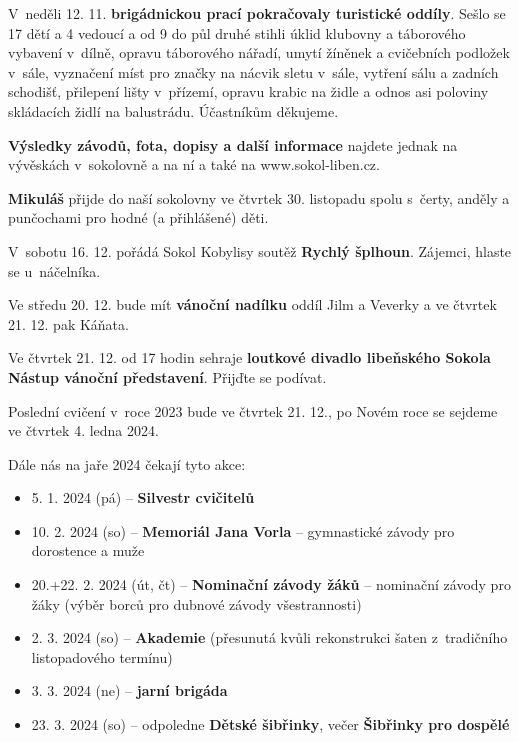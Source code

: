 \documentclass[11pt]{article}
\begin{document}
V~neděli 12. 11. \textbf{brigádnickou prací pokračovaly turistické oddíly}. Sešlo se 17 dětí a 4 vedoucí a od 9 do půl druhé stihli úklid klubovny a táborového vybavení v~dílně, opravu táborového nářadí, umytí žíněnek a cvičebních podložek v~sále, vyznačení míst pro značky na nácvik sletu v~sále, vytření sálu a zadních schodišť, přilepení lišty v~přízemí, opravu krabic na židle a odnos asi poloviny skládacích židlí na balustrádu.
Účastníkům děkujeme. 

\textbf{Výsledky závodů, fota, dopisy a další informace} najdete jednak na vývěskách v~sokolovně a na ní a také na www.sokol-liben.cz.

\textbf{Mikuláš} přijde do naší sokolovny ve čtvrtek 30. listopadu spolu s~čerty, anděly a punčochami pro hodné (a přihlášené) děti.

V~sobotu 16. 12. pořádá Sokol Kobylisy soutěž \textbf{Rychlý šplhoun}. Zájemci, hlaste se u~náčelníka.

Ve středu 20. 12. bude mít \textbf{vánoční nadílku} oddíl Jilm a Veverky a ve čtvrtek 21. 12. pak Káňata.

Ve čtvrtek 21. 12. od 17 hodin sehraje \textbf{loutkové divadlo libeňského Sokola Nástup vánoční představení}. Přijďte se podívat.

Poslední cvičení v~roce 2023 bude ve čtvrtek 21. 12., po Novém roce se sejdeme ve čtvrtek 4. ledna 2024.

Dále nás na jaře 2024 čekají tyto akce:
\begin{itemize}[
  itemsep=-3pt,
  leftmargin=2.5em,
  itemindent=-1em
]
  \item[] 5. 1. 2024 (pá) – \textbf{Silvestr cvičitelů}
  \item[] 10. 2. 2024 (so) – \textbf{Memoriál Jana Vorla}  – gymnastické závody pro dorostence a muže
  \item[] 20.+22. 2. 2024 (út, čt) – \textbf{Nominační závody žáků} – nominační závody pro žáky (výběr borců pro dubnové závody všestrannosti)
  \item[] 2. 3. 2024 (so) – \textbf{Akademie} (přesunutá kvůli rekonstrukci šaten z~tradičního listopadového termínu)
  \item[] 3. 3. 2024 (ne) – \textbf{jarní brigáda}
  \item[] 23. 3. 2024 (so) – odpoledne \textbf{Dětské šibřinky}, večer \textbf{Šibřinky pro dospělé}
\end{itemize}
\end{document}
